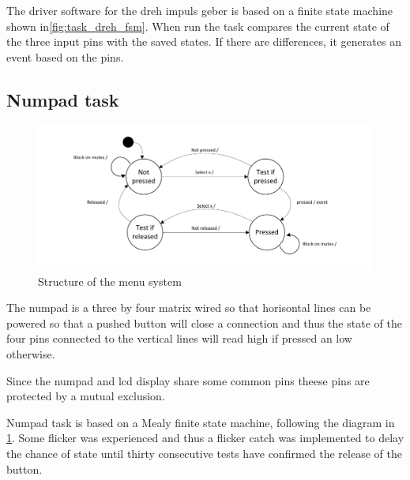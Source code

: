 The driver software for the dreh impuls geber is based on a finite state machine shown in\ref{fig:task_dreh_fsm}. When run the task compares the current state of the three input pins with the saved states. If there are differences, it generates an event based on the pins.

\subsection{Numpad task}
\begin{figure}[htb]
	\centering
	\includegraphics[width=\textwidth,trim=0 0 0 0]{graphics/numpad_task_fsm.pdf} 
	\caption{Structure of the menu system}
	\label{fig:task_numpad_fsm}
\end{figure}
The numpad is a three by four matrix wired so that horisontal lines can be powered so that a pushed button will close a connection and thus the state of the four pins connected to the vertical lines will read high if pressed an low otherwise.

Since the numpad and lcd display share some common pins theese pins are protected by a mutual exclusion.

Numpad task is based on a Mealy finite state machine, following the diagram in \ref{fig:task_numpad_fsm}.  Some flicker was experienced and thus a flicker catch was implemented to delay the chance of state until thirty consecutive tests have confirmed the release of the button.

